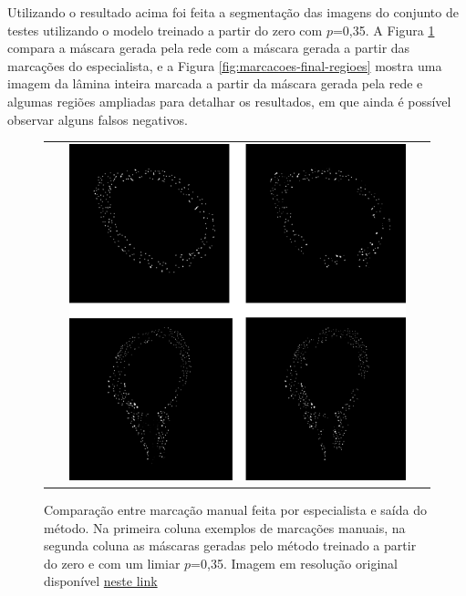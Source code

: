 Utilizando o resultado acima foi feita a segmentação das imagens do conjunto de testes utilizando o modelo treinado a partir do zero com $p$=0,35. A Figura \ref{fig:marcacoes-final} compara a máscara gerada pela rede com a máscara gerada a partir das marcações do especialista, e a Figura \ref{fig:marcacoes-final-regioes} mostra uma imagem da lâmina inteira marcada a partir da máscara gerada pela rede e algumas regiões ampliadas para detalhar os resultados, em que ainda é possível observar alguns falsos negativos.

\begin{figure}
    \center
    \begin{tabular}{@{}c@{}}
        \includegraphics[width=0.9\textwidth]{figures/4_results/figure-manuel-net-results-comparision_lower_res.png}
        \\[\abovecaptionskip]
    \end{tabular}
  
    \caption[Comparação entre marcação manual feita por especialista e saída do método.]{Comparação entre marcação manual feita por especialista e saída do método. Na primeira coluna exemplos de marcações manuais, na segunda coluna as máscaras geradas pelo método treinado a partir do zero e com um limiar $p$=0,35. Imagem em resolução original disponível \href{https://github.com/igorgonribs/dissertacao/blob/master/figures/4_results/figure-manuel-net-results-comparision.png}{neste link}}
    \label{fig:marcacoes-final}
\end{figure}


